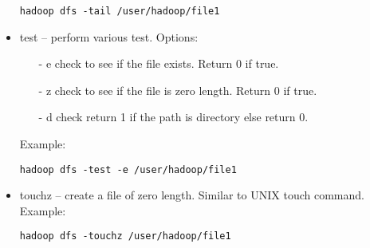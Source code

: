 \documentclass[12pt,a4paper]{article}
\begin{document}
\begin{itemize}
\begin{verbatim}
hadoop dfs -tail /user/hadoop/file1
\end{verbatim}

\item test – perform various test. Options: \begin{itemize}
\item[-]e check to see if the file exists. Return 0 if true.
\item[-]z check to see if the file is zero length. Return 0 if true.
\item[-]d check return 1 if the path is directory else return 0.

\end{itemize}
Example:
\begin{verbatim}
hadoop dfs -test -e /user/hadoop/file1
\end{verbatim}

\item touchz – create a file of zero length. Similar to UNIX touch command.
Example:
\begin{verbatim}
hadoop dfs -touchz /user/hadoop/file1
\end{verbatim}


\end{itemize}
\end{document}

